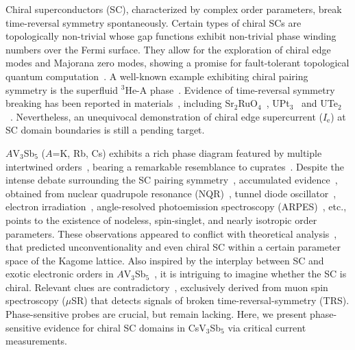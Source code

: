 \documentclass[article,reprint,amsmath,amssymb,superscriptaddress,longbibliography]{revtex4-1}
\begin{document}
\noindent
Chiral superconductors (SC), characterized by complex order parameters, break time-reversal symmetry spontaneously. Certain types of chiral SCs are topologically non-trivial whose gap
functions exhibit non-trivial phase winding numbers over the Fermi surface. They allow for the exploration of chiral edge modes and Majorana zero modes, showing a promise for fault-tolerant topological quantum computation~\cite{Ivanov2001PRL}. A well-known example exhibiting chiral pairing symmetry is the superfluid $^3$He-A phase~\cite{Leggett1975RMP}. Evidence of time-reversal symmetry breaking has been reported in materials~\cite{Kallin2016RPP,Kapitulnik2014Science,JiaoL2020Nature,Weitering2023NP}, including Sr$_2$RuO$_4$~\cite{Kallin2016RPP}, UPt$_3$~\cite{Kapitulnik2014Science} and UTe$_2$ ~\cite{JiaoL2020Nature}. Nevertheless, an unequivocal demonstration of chiral edge supercurrent ($I_\textrm{e}$) at SC domain boundaries is still a pending target.


$A$V$_3$Sb$_5$ ($A$=K, Rb, Cs) exhibits a rich phase diagram featured by multiple intertwined  orders~\cite{Miao2021PRX,Wilson2021PRX,Guguchia2022Nature,Hasan2021NM,WuL2022NP,Moll2022Nature,ChenXH2022Nature,Zeljkovic2022NP,Zeljkovic2023NP,GaoHJ2021Nature}, bearing a remarkable resemblance to cuprates~\cite{Zaanen2015Nature}. Despite the intense debate surrounding the SC pairing symmetry~\cite{LiSY2021Arxiv,Khasanov2023NC}, accumulated evidence~\cite{LuoJL2021CPL,Yuan2021SCPMA,Shibauchi2023NC,Okazaki2023Nature,FengDL2021PRL}, obtained from nuclear quadrupole resonance (NQR)~\cite{LuoJL2021CPL}, tunnel diode oscillator~\cite{Yuan2021SCPMA}, electron irradiation~\cite{Shibauchi2023NC}, angle-resolved photoemission spectroscopy (ARPES)~\cite{Okazaki2023Nature}, etc., points to the existence of nodeless,  spin-singlet, and nearly isotropic order parameters. These observations appeared to conflict with theoretical analysis~\cite{Thomale2021PRL,LiJX2012PRB}, that predicted unconventionality and even chiral SC within a certain parameter space of the Kagome lattice. Also inspired by the interplay between SC and exotic electronic orders in $A$V$_3$Sb$_5$~\cite{ChenXH2022Nature1,Hasan2021NM,GaoHJ2021Nature}, it is intriguing to imagine whether the SC is chiral. Relevant clues are contradictory~\cite{Guguchia2022Nature,Khasanov2022CP,Khasanov2023NC,Okazaki2023Nature}, exclusively derived from muon spin spectroscopy ($\mu$SR) that detects signals of broken time-reversal-symmetry (TRS). Phase-sensitive probes are crucial, but remain lacking. Here, we present phase-sensitive evidence for chiral SC domains in CsV$_3$Sb$_5$ via critical current measurements.   
\end{document}
